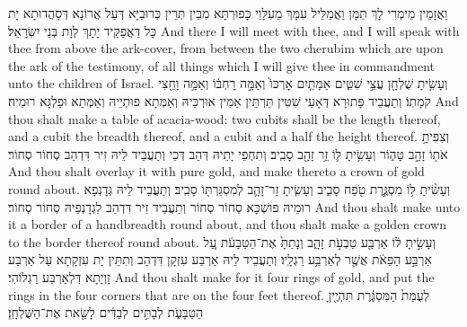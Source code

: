 {וַאֲזָמֵין מֵימְרִי לָךְ תַּמָּן וַאֲמַלֵּיל עִמָּךְ מֵעִלָּוֵי כָּפוּרְתָּא מִבֵּין תְּרֵין כְּרוּבַיָּא דְּעַל אֲרוֹנָא דְּסָהֲדוּתָא יָת כָּל דַּאֲפַקֵּיד יָתָךְ לְוָת בְּנֵי יִשְׂרָאֵל׃}
{And there I will meet with thee, and I will speak with thee from above the ark-cover, from between the two cherubim which are upon the ark of the testimony, of all things which I will give thee in commandment unto the children of Israel.}{}
{וְעָשִׂ֥יתָ שֻׁלְחָ֖ן עֲצֵ֣י שִׁטִּ֑ים אַמָּתַ֤יִם אׇרְכּוֹ֙ וְאַמָּ֣ה רׇחְבּ֔וֹ וְאַמָּ֥ה וָחֵ֖צִי קֹמָתֽוֹ׃
}
{וְתַעֲבֵיד פָּתוּרָא דְּאָעֵי שִׁטִּין תַּרְתֵּין אַמִּין אוּרְכֵּיהּ וְאַמְּתָא פוּתְיֵיהּ וְאַמְּתָא וּפַלְגָּא רוּמֵיהּ׃}
{And thou shalt make a table of acacia-wood: two cubits shall be the length thereof, and a cubit the breadth thereof, and a cubit and a half the height thereof.}{}
{וְצִפִּיתָ֥ אֹת֖וֹ זָהָ֣ב טָה֑וֹר וְעָשִׂ֥יתָ לּ֛וֹ זֵ֥ר זָהָ֖ב סָבִֽיב׃
}
{וְתִחְפֵי יָתֵיהּ דְּהַב דְּכֵי וְתַעֲבֵיד לֵיהּ זִיר דִּדְהַב סְחוֹר סְחוֹר׃}
{And thou shalt overlay it with pure gold, and make thereto a crown of gold round about.}{}
{וְעָשִׂ֨יתָ לּ֥וֹ מִסְגֶּ֛רֶת טֹ֖פַח סָבִ֑יב וְעָשִׂ֧יתָ זֵר־זָהָ֛ב לְמִסְגַּרְתּ֖וֹ סָבִֽיב׃
}
{וְתַעֲבֵיד לֵיהּ גְּדָנְפָא רוּמֵיהּ פּוּשְׁכָּא סְחוֹר סְחוֹר וְתַעֲבֵיד זִיר דִּדְהַב לִגְדָנְפֵיהּ סְחוֹר סְחוֹר׃}
{And thou shalt make unto it a border of a handbreadth round about, and thou shalt make a golden crown to the border thereof round about.}{}
{וְעָשִׂ֣יתָ לּ֔וֹ אַרְבַּ֖ע טַבְּעֹ֣ת זָהָ֑ב וְנָתַתָּ֙ אֶת־הַטַּבָּעֹ֔ת עַ֚ל אַרְבַּ֣ע הַפֵּאֹ֔ת אֲשֶׁ֖ר לְאַרְבַּ֥ע רַגְלָֽיו׃}
{וְתַעֲבֵיד לֵיהּ אַרְבַּע עִזְקָן דִּדְהַב וְתִתֵּין יָת עִזְקָתָא עַל אַרְבַּע זָוְיָתָא דִּלְאַרְבַּע רַגְלוֹהִי׃}
{And thou shalt make for it four rings of gold, and put the rings in the four corners that are on the four feet thereof.}{}
{לְעֻמַּת֙ הַמִּסְגֶּ֔רֶת תִּהְיֶ֖יןָ הַטַּבָּעֹ֑ת לְבָתִּ֣ים לְבַדִּ֔ים לָשֵׂ֖את אֶת־הַשֻּׁלְחָֽן׃
}
